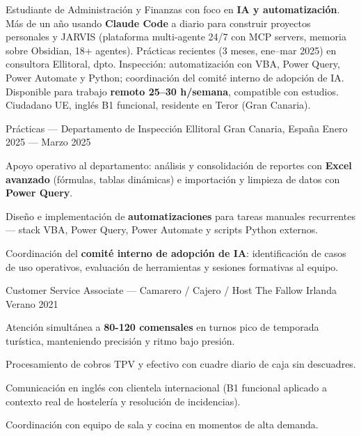 \documentclass[10pt, a4paper]{awesome-cv}
\begin{document}
\begin{minipage}[t]{0.66\textwidth}
\vspace{0pt}



\begin{cvparagraph}
Estudiante de Administración y Finanzas con foco en \textbf{IA y automatización}. Más de un año usando \textbf{Claude Code} a diario para construir proyectos personales y JARVIS (plataforma multi-agente 24/7 con MCP servers, memoria sobre Obsidian, 18+ agentes). Prácticas recientes (3 meses, ene–mar 2025) en consultora Ellitoral, dpto. Inspección: automatización con VBA, Power Query, Power Automate y Python; coordinación del comité interno de adopción de IA. Disponible para trabajo \textbf{remoto 25–30 h/semana}, compatible con estudios. Ciudadano UE, inglés B1 funcional, residente en Teror (Gran Canaria).
\end{cvparagraph}



\begin{cventries}
\cventry
  { Prácticas — Departamento de Inspección }
  { Ellitoral }
  { Gran Canaria, España }
  { Enero 2025 — Marzo 2025 }
  {
\begin{cvitems}
    \item { Apoyo operativo al departamento: análisis y consolidación de reportes con \textbf{Excel avanzado} (fórmulas, tablas dinámicas) e importación y limpieza de datos con \textbf{Power Query}. }
    \item { Diseño e implementación de \textbf{automatizaciones} para tareas manuales recurrentes — stack VBA, Power Query, Power Automate y scripts Python externos. }
    \item { Coordinación del \textbf{comité interno de adopción de IA}: identificación de casos de uso operativos, evaluación de herramientas y sesiones formativas al equipo. }
  \end{cvitems}
  }
\cventry
  { Customer Service Associate — Camarero / Cajero / Host }
  { The Fallow }
  { Irlanda }
  { Verano 2021 }
  {
\begin{cvitems}
    \item { Atención simultánea a \textbf{80-120 comensales} en turnos pico de temporada turística, manteniendo precisión y ritmo bajo presión. }
    \item { Procesamiento de cobros TPV y efectivo con cuadre diario de caja sin descuadres. }
    \item { Comunicación en inglés con clientela internacional (B1 funcional aplicado a contexto real de hostelería y resolución de incidencias). }
    \item { Coordinación con equipo de sala y cocina en momentos de alta demanda. }
  \end{cvitems}
  }
\end{cventries}




\end{minipage}
\end{document}
